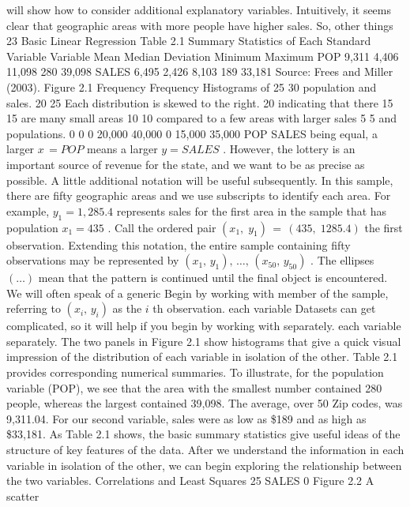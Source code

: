 \documentclass[11pt]{article}
\begin{document}
will show how to consider additional explanatory variables. Intuitively, it seems
clear that geographic areas with more people have higher sales. So, other things
23
 Basic Linear Regression
Table 2.1 Summary
Statistics of Each Standard
Variable Variable Mean Median Deviation Minimum Maximum
POP 9,311 4,406 11,098 280 39,098
SALES 6,495 2,426 8,103 189 33,181
Source: Frees and Miller (2003).
Figure 2.1 Frequency Frequency
Histograms of 25 30
 population and sales. 20 25
Each distribution is
skewed to the right. 20
indicating that there 15 15
 are many small areas 10 10
compared to a few
 areas with larger sales 5 5
 and populations. 0 0
0 20,000 40,000 0 15,000 35,000
POP SALES
 being equal, a larger \(x \,=P O P\) means a larger \(y=S A L E S\) . However, the lottery
is an important source of revenue for the state, and we want to be as precise as
 possible.
 A little additional notation will be useful subsequently. In this sample, there are
fifty geographic areas and we use subscripts to identify each area. For example,
\(y_{1}=1 , \! 2 8 5 . 4\) represents sales for the first area in the sample that has population
\(x_{1}=4 3 5\) . Call the ordered pair \(( x_{1} , \; y_{1} ) \,=\, ( 4 3 5 , \; 1 2 8 5 . 4 )\) the first observation.
Extending this notation, the entire sample containing fifty observations may be
represented by \(( x_{1} , \, y_{1} ) , \, \dots, \, ( x_{5 0} , \, y_{5 0} )\) . The ellipses \(( \ldots)\) mean that the pattern is
continued until the final object is encountered. We will often speak of a generic
Begin by working with member of the sample, referring to \(( x_{i} , \, y_{i} )\) as the \(i\) th observation.
each variable Datasets can get complicated, so it will help if you begin by working with
 separately. each variable separately. The two panels in Figure 2.1 show histograms that give
 a quick visual impression of the distribution of each variable in isolation of the
other. Table 2.1 provides corresponding numerical summaries. To illustrate, for
the population variable (POP), we see that the area with the smallest number
contained 280 people, whereas the largest contained 39,098. The average, over
50 Zip codes, was 9,311.04. For our second variable, sales were as low as \$189
and as high as \$33,181.
As Table 2.1 shows, the basic summary statistics give useful ideas of the
structure of key features of the data. After we understand the information in each
variable in isolation of the other, we can begin exploring the relationship between
 the two variables.
 Correlations and Least Squares 25
SALES 0 Figure 2.2 A scatter
\end{document}
